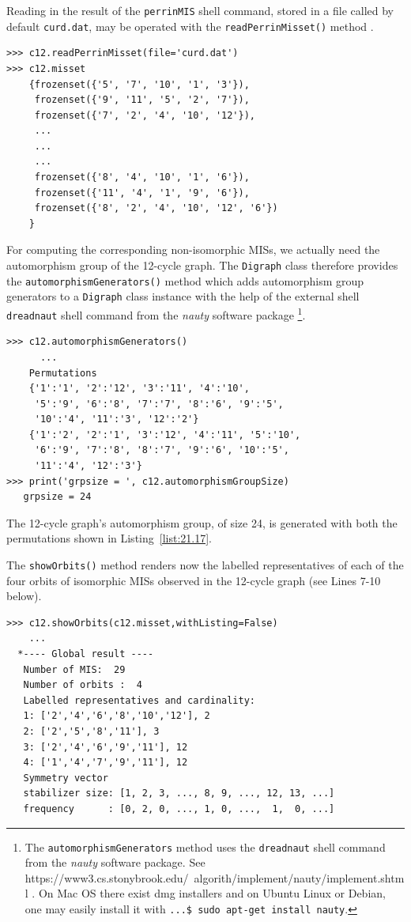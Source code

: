 Reading in the result of the \texttt{perrinMIS} shell command, stored in a file called by default \texttt{curd.dat}, may be operated with the \texttt{readPerrinMisset()} method .
\begin{lstlisting}
>>> c12.readPerrinMisset(file='curd.dat')
>>> c12.misset
    {frozenset({'5', '7', '10', '1', '3'}),
     frozenset({'9', '11', '5', '2', '7'}),
     frozenset({'7', '2', '4', '10', '12'}),
     ...
     ...
     ...
     frozenset({'8', '4', '10', '1', '6'}),
     frozenset({'11', '4', '1', '9', '6'}),
     frozenset({'8', '2', '4', '10', '12', '6'})
    }
\end{lstlisting}

For computing the corresponding non-isomorphic MISs, we actually need the automorphism group of the 12-cycle graph. The \texttt{Digraph} class therefore provides the \texttt{automorphismGenerators()} method which adds automorphism group generators to a \texttt{Digraph} class instance with the help of the external shell \texttt{dreadnaut} shell command from the \emph{nauty} software package \footnote{The \texttt{automorphismGenerators} method uses the \texttt{dreadnaut} shell command from the \emph{nauty} software package. See https://www3.cs.stonybrook.edu/~algorith/implement/nauty/implement.shtml . On Mac OS there exist dmg installers and on Ubuntu Linux or Debian, one may easily install it with \texttt{...\$ sudo apt-get install nauty}.}.
\begin{lstlisting}[caption={Computing the automorphism group generators},label=list:21.17]
>>> c12.automorphismGenerators()
      ...
    Permutations
    {'1':'1', '2':'12', '3':'11', '4':'10',
     '5':'9', '6':'8', '7':'7', '8':'6', '9':'5',
     '10':'4', '11':'3', '12':'2'}
    {'1':'2', '2':'1', '3':'12', '4':'11', '5':'10', 
     '6':'9', '7':'8', '8':'7', '9':'6', '10':'5', 
     '11':'4', '12':'3'}
>>> print('grpsize = ', c12.automorphismGroupSize)
   grpsize = 24
\end{lstlisting}

The 12-cycle graph's automorphism group, of size 24, is generated with both the permutations shown in Listing~\vref{list:21.17}.

The \texttt{showOrbits()} method renders now the labelled representatives of each of the four orbits of isomorphic MISs observed in the 12-cycle graph (see Lines 7-10 below).
\begin{lstlisting}[caption={Computing the MISs orbits of the 12-cycle graph},label=list:21.18]
>>> c12.showOrbits(c12.misset,withListing=False)
    ...
  *---- Global result ----
   Number of MIS:  29
   Number of orbits :  4
   Labelled representatives and cardinality:
   1: ['2','4','6','8','10','12'], 2
   2: ['2','5','8','11'], 3
   3: ['2','4','6','9','11'], 12
   4: ['1','4','7','9','11'], 12
   Symmetry vector
   stabilizer size: [1, 2, 3, ..., 8, 9, ..., 12, 13, ...]
   frequency      : [0, 2, 0, ..., 1, 0, ...,  1,  0, ...]
\end{lstlisting}

